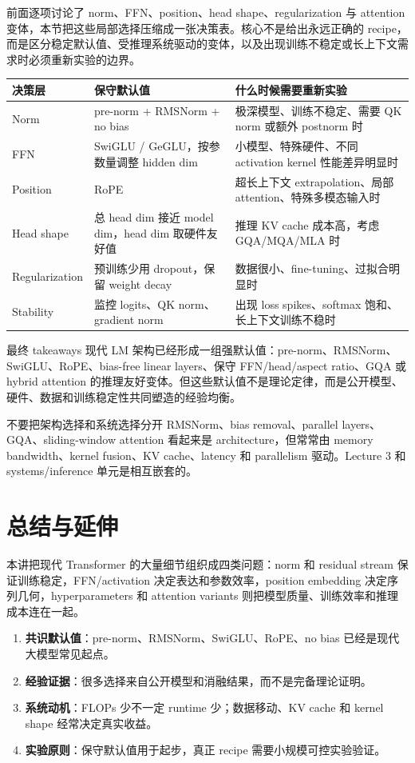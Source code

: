 \documentclass[a4paper]{article}
\begin{document}
前面逐项讨论了 norm、FFN、position、head shape、regularization 与 attention 变体，本节把这些局部选择压缩成一张决策表。核心不是给出永远正确的 recipe，而是区分稳定默认值、受推理系统驱动的变体，以及出现训练不稳定或长上下文需求时必须重新实验的边界。
\begin{longtable}{p{}p{}p{}}
\toprule
\textbf{决策层} & \textbf{保守默认值} & \textbf{什么时候需要重新实验} \\
\midrule
Norm & pre-norm + RMSNorm + no bias & 极深模型、训练不稳定、需要 QK norm 或额外 postnorm 时 \\
FFN & SwiGLU / GeGLU，按参数量调整 hidden dim & 小模型、特殊硬件、不同 activation kernel 性能差异明显时 \\
Position & RoPE & 超长上下文 extrapolation、局部 attention、特殊多模态输入时 \\
Head shape & 总 head dim 接近 model dim，head dim 取硬件友好值 & 推理 KV cache 成本高，考虑 GQA/MQA/MLA 时 \\
Regularization & 预训练少用 dropout，保留 weight decay & 数据很小、fine-tuning、过拟合明显时 \\
Stability & 监控 logits、QK norm、gradient norm & 出现 loss spikes、softmax 饱和、长上下文训练不稳时 \\
\bottomrule
\end{longtable}
\begin{importantbox}{最终 takeaways}
现代 LM 架构已经形成一组强默认值：pre-norm、RMSNorm、SwiGLU、RoPE、bias-free linear layers、保守 FFN/head/aspect ratio、GQA 或 hybrid attention 的推理友好变体。但这些默认值不是理论定律，而是公开模型、硬件、数据和训练稳定性共同塑造的经验均衡。
\end{importantbox}
\begin{warningbox}{不要把架构选择和系统选择分开}
RMSNorm、bias removal、parallel layers、GQA、sliding-window attention 看起来是 architecture，但常常由 memory bandwidth、kernel fusion、KV cache、latency 和 parallelism 驱动。Lecture 3 和 systems/inference 单元是相互嵌套的。
\end{warningbox}
\section{总结与延伸}
本讲把现代 Transformer 的大量细节组织成四类问题：norm 和 residual stream 保证训练稳定，FFN/activation 决定表达和参数效率，position embedding 决定序列几何，hyperparameters 和 attention variants 则把模型质量、训练效率和推理成本连在一起。
\begin{enumerate}
    \item \textbf{共识默认值}：pre-norm、RMSNorm、SwiGLU、RoPE、no bias 已经是现代大模型常见起点。
    \item \textbf{经验证据}：很多选择来自公开模型和消融结果，而不是完备理论证明。
    \item \textbf{系统动机}：FLOPs 少不一定 runtime 少；数据移动、KV cache 和 kernel shape 经常决定真实收益。
    \item \textbf{实验原则}：保守默认值用于起步，真正 recipe 需要小规模可控实验验证。
\end{enumerate}
\end{document}
